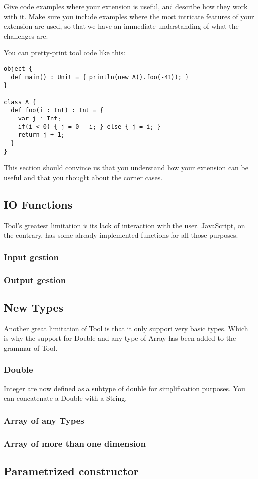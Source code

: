 Give code examples where your extension is useful, and describe how they work
with it. Make sure you include examples where the most intricate features of
your extension are used, so that we have an immediate understanding of what the
challenges are.

You can pretty-print tool code like this:
\begin{lstlisting}
object {
  def main() : Unit = { println(new A().foo(-41)); }
}

class A {
  def foo(i : Int) : Int = {
    var j : Int;
    if(i < 0) { j = 0 - i; } else { j = i; }
    return j + 1;
  }
}
\end{lstlisting}

This section should convince us that you understand how your extension can be
useful and that you thought about the corner cases.

\subsection{IO Functions}
Tool's greatest limitation is its lack of interaction with the user. JavaScript, on the  contrary, has some already implemented functions for all those purposes.
\subsubsection{Input gestion}
\subsubsection{Output gestion}

\subsection{New Types}
Another great limitation of Tool is that it only support very basic types. Which is why the support for Double and any type of Array has been added to the grammar of Tool.
\subsubsection{Double}
Integer are now defined as a subtype of double for simplification purposes.
You can concatenate a Double with a String.
\subsubsection{Array of any Types}
\subsubsection{Array of more than one dimension}
\subsection{Parametrized constructor}


